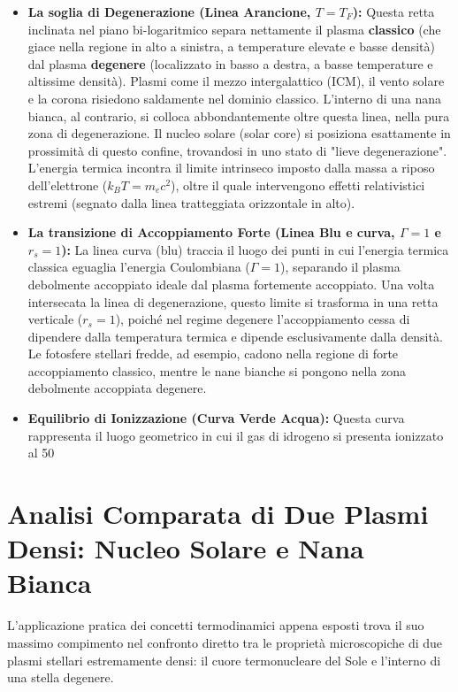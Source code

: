 \begin{itemize}
\item \textbf{La soglia di Degenerazione (Linea Arancione, $T = T_F$):} Questa retta inclinata nel piano bi-logaritmico separa nettamente il plasma \textbf{classico} (che giace nella regione in alto a sinistra, a temperature elevate e basse densità) dal plasma \textbf{degenere} (localizzato in basso a destra, a basse temperature e altissime densità). Plasmi come il mezzo intergalattico (ICM), il vento solare e la corona risiedono saldamente nel dominio classico. L'interno di una nana bianca, al contrario, si colloca abbondantemente oltre questa linea, nella pura zona di degenerazione. Il nucleo solare (solar core) si posiziona esattamente in prossimità di questo confine, trovandosi in uno stato di "lieve degenerazione". L'energia termica incontra il limite intrinseco imposto dalla massa a riposo dell'elettrone ($k_B T = m_e c^2$), oltre il quale intervengono effetti relativistici estremi (segnato dalla linea tratteggiata orizzontale in alto).
\item \textbf{La transizione di Accoppiamento Forte (Linea Blu e curva, $\Gamma = 1$ e $r_s = 1$):} La linea curva (blu) traccia il luogo dei punti in cui l'energia termica classica eguaglia l'energia Coulombiana ($\Gamma = 1$), separando il plasma debolmente accoppiato ideale dal plasma fortemente accoppiato. Una volta intersecata la linea di degenerazione, questo limite si trasforma in una retta verticale ($r_s = 1$), poiché nel regime degenere l'accoppiamento cessa di dipendere dalla temperatura termica e dipende esclusivamente dalla densità. Le fotosfere stellari fredde, ad esempio, cadono nella regione di forte accoppiamento classico, mentre le nane bianche si pongono nella zona debolmente accoppiata degenere.
\item \textbf{Equilibrio di Ionizzazione (Curva Verde Acqua):} Questa curva rappresenta il luogo geometrico in cui il gas di idrogeno si presenta ionizzato al 50%
\end{itemize}

\section{Analisi Comparata di Due Plasmi Densi: Nucleo Solare e Nana Bianca}

L'applicazione pratica dei concetti termodinamici appena esposti trova il suo massimo compimento nel confronto diretto tra le proprietà microscopiche di due plasmi stellari estremamente densi: il cuore termonucleare del Sole e l'interno di una stella degenere.


